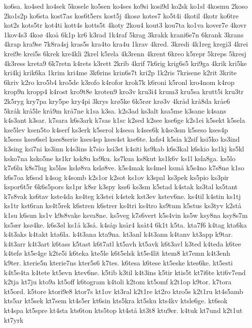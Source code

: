 {ko6sa.
ko4sed
ko4sek
5kosele
ko5sen
ko4ses
ko9si
kosi9d
ko2sk
ko1sl
4kosmu
2koso
2ko1s2p
ko6sta
kost7as
kos6t5ers
kost5j
4kosø
kotes7
ko5t4i
4kotil
4kotr
ko6tre
kot2s
kots5tr
kot4ti
kott4s
kotts5t
4koty
2kou4
kout3
kou7ta
ko1va
kover7e
4kovr
1kov4s3
4koø
4koå
6k1p
kr6
k3rad
1k4raf
5krag
3krakk
krani6e7n
6krank
3krans
4krap
kra9se
7k8ra4sj
kras5s
kra4to
kra4u
1krav
4kred.
3kredi
4k1reg
kregi3
4krei
krei9e
krei5s
6krek
kre4kli
2krel
k5rela
4k3renn
4krent
6kreo
k5repr
5kreps
5kresj
4k3ress
kreta9
6k7retn
k4rets
k3rett
2krib
4krif
7k6rig
krig6s5
kri9ga
4krik
kri5ke
kri4kj
krik6ka
1krim
kri4me
3k6rins
krin6s7t
kri2p
1k2ris
7krisene
k2rit
3krite
6kriv
k2ro
kro5b4
kro5de
k3rofo
k4rofor
krok7k
k6roni
k5ronl
kro4nom
k4rop
krop9n
kropp4
k4rost
kro9t8e
kroten9
kro3v
kru3i4
krum3
kru5sa
krutt5i
kru3tr
2k5ryg
kry7pa
kry5pe
kry4pi
3krys
krø5ke
6k5rør
krø3v
4kråd
krå8da
kråe6
5kråk
krå5le
krå9m
krå7ne
k1sa
k3sa.
k2s3ad
ks3alt
ksa5me
k3sane
k4sans
k4s3ant
k3sar.
k7sara
k6s3ark
k7sas
k1sc
k2sed
k2see
kse6ge
k2s1ei
k5sekt
k5sela
kse5lev
ksen5to
k4serf
ks3erk
k5serol
k4sesa
k4ses6k
k4se3sm
k5seso
kses4p
k5sess
kses6sel
kses8serie
kses4sp
kses4st
kse6te.
ksfø4
k5sia
k2sif
ksi5ko
ks3ind
k3sing
ksi7ni
ks3inn
k4s3ins
k7sio
ksi3st
k4siti
ks9kab
k6s3kal
k6skio
ks1kj
ks5kl
ksko7na
ksko5ne
ks1kr
ksk8u
ks9ku.
ks7kua
ks8kut
ks1k6v
ks1l
ksla8ga.
ks5lo
k7s6lu
k8s7lug
ks5løs
kslø8va
kslø8ve.
k5s4mak
ks4mel
ksmå
k5s4no
k7s8nø
k1so
k6s7oa
k6sod
k4sog
k4somb
k2s1or
k2sot
ks1ov
k3spal
ks3pek
ks5pio
ks3pir
kspor6t5r
6k6s5pors
ks1pr
k8sr
k3spy
kss6
ks3sm
k5stad
k4stak
ks3tal
ks5tant
k7s8vak
ks6tav
kste4da
ks4teg
k3stei
k4stek
kst3ev
kstev6ne.
ks4til
k4stin
ks1tj
ks1tr
kst6ran
ks4t5rek
k6stren
k6strer
ks4tri
ks4tro
ks9tum
k5stus
ks3tyv
k2stå
k1su
k6sun
ks1v
k9s8vake
ksva8ne.
ks5veg
k7s6vert
k5s4vin
ks5w
ksy8na
ksy8s7m
ks5ær
ksø4ke.
k6s3øl
ks1å
k3så.
k4såp
ksår4
ksåt4
6k1t
k5ta.
kta7f6
k4tag
kta6ka
k4t3aks
k4takt
kta6la.
k4t3ana
kta9na.
kt3anl
k4t3ann
k4tanv
kt3app
k9tar.
k4t3arr
k4t3art
k6tass
k5tast
k6t7atl
kt5avh
kt5avk
k6t3avl
k3ted
k4teda
k6tee
k4tefø
kt5e4ge
k2te5i
k6teka
kte5le
k6t5elsk
kt5e4lit
ktem8
kt7emn
k4t3enh
k9ter.
kterie5n
kterie7ns
kter5s6
k7tes.
k6tesa
k6tese
kt5eske
ktes6ke.
kt5esti
k4t5e4ta
k4tete
kt5evn
ktev6ne.
k5tib
k3til
k4t3ins
k5tir
ktis5t
kt7i6te
kti6v7end
k2tja
kt7ju
kto9a
kt5off
k6togram
k4toli
k2tom
kt5omf
k2t1op
k9tor.
k7tora
kt5ord.
k5tore
ktori9e8
ktor7s
kt1ov
kt3ral
k2t1re
kt2ro
ktro5s
k2t1ru
kt4s5amb
kts5ar
kt5sek
kt7sem
kt4s5er
kt6sin
kts5kra
kt5sku
kts4kv
ktsle6ge.
kt6sok
kt4spa
kt5spre
kt4sta
kts6ton
kts5top
kt4stå
kt3t8
ktu9er.
k4tuk
kt7und
k2t1ut
kt7yrk
}

